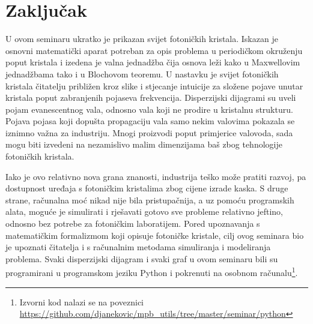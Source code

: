 \documentclass[utf8, seminar, numeric]{fer}
\begin{document}
\chapter{Zaključak}

U ovom seminaru ukratko je prikazan svijet fotoničkih kristala. Iskazan je osnovni
matematički aparat potreban za opis problema u periodičkom okruženju poput
kristala i izedena je valna jednadžba čija osnova leži kako u Maxwellovim
jednadžbama tako i u Blochovom teoremu. U nastavku je svijet fotoničkih kristala
čitatelju približen kroz slike i stjecanje intuicije za složene pojave unutar
kristala poput zabranjenih pojaseva frekvencija. Disperzijski dijagrami su uveli pojam
evanescentnog vala, odnosno vala koji ne prodire u kristalnu strukturu. Pojava
pojasa koji dopušta propagaciju vala samo nekim valovima pokazala se iznimno
važna za industriju. Mnogi proizvodi poput primjerice valovoda, sada mogu biti
izvedeni na nezamislivo malim dimenzijama baš zbog tehnologije fotoničkih
kristala.

Iako je ovo relativno nova grana znanosti, industrija teško može pratiti
razvoj, pa dostupnost uređaja s fotoničkim kristalima zbog cijene izrade kaska.
S druge strane, računalna moć nikad nije bila pristupačnija, a uz pomoću
programskih alata, moguće je simulirati i rješavati gotovo sve probleme
relativno jeftino, odnosno bez potrebe za fotoničkim laboratijem. Pored
upoznavanja s matematičkim formalizmom koji opisuje fotoničke kristale, cilj ovog
seminara bio je upoznati čitatelja i s računalnim metodama simuliranja i
modeliranja problema. Svaki disperzijski dijagram i svaki graf u ovom seminaru
bili su programirani u programskom jeziku Python i pokrenuti na osobnom
računalu\footnote{ Izvorni kod nalazi se na poveznici
\url{https://github.com/djanekovic/mpb_utils/tree/master/seminar/python}}.




\nocite{*}
\end{document}
